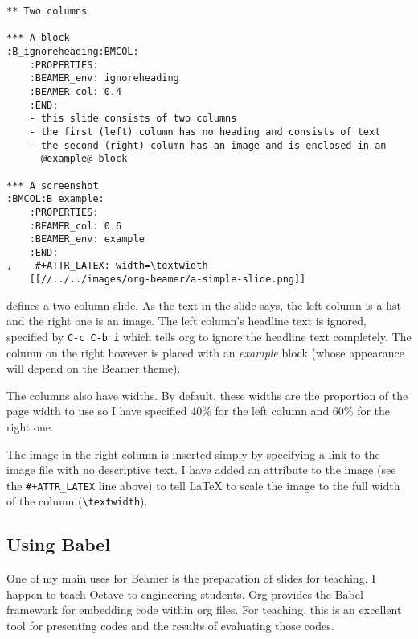 \documentclass[presentation]{beamer}
\begin{document}
\begin{verbatim}
** Two columns

*** A block                                           :B_ignoreheading:BMCOL:
    :PROPERTIES:
    :BEAMER_env: ignoreheading
    :BEAMER_col: 0.4
    :END:
    - this slide consists of two columns
    - the first (left) column has no heading and consists of text
    - the second (right) column has an image and is enclosed in an
      @example@ block

*** A screenshot                                            :BMCOL:B_example:
    :PROPERTIES:
    :BEAMER_col: 0.6
    :BEAMER_env: example
    :END:
,    #+ATTR_LATEX: width=\textwidth
    [[//../../images/org-beamer/a-simple-slide.png]]
\end{verbatim}

defines a two column slide.  As the text in the slide says, the left
column is a list and the right one is an image.  The left column's
headline text is ignored, specified by \texttt{C-c C-b i} which tells org to
\alert{ignore} the headline text completely.  The column on the right
however is placed with an \emph{example} block (whose appearance will
depend on the Beamer theme).

The columns also have widths.  By default, these widths are the
proportion of the page width to use so I have specified 40\% for the
left column and 60\% for the right one.

The image in the right column is inserted simply by specifying a link
to the image file with no descriptive text.  I have added an attribute
to the image (see the \texttt{\#+ATTR\_LATEX} line above) to tell \LaTeX{} to scale
the image to the full width of the column (\texttt{\textbackslash{}textwidth}).

\subsection{Using Babel}
\label{sec:org2fe1fea}
One of my main uses for Beamer is the preparation of slides for
teaching.  I happen to teach Octave to engineering students.  Org
provides the Babel framework for embedding code within org
files.  For teaching, this is an excellent tool for presenting codes
and the results of evaluating those codes.
\end{document}
